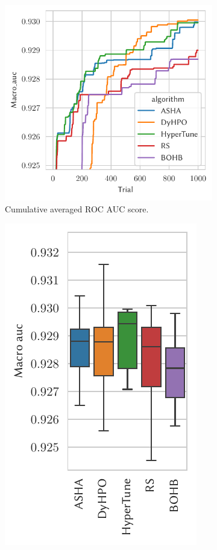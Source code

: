 \begin{figure}[H]
    \begin{subfigure}{.47\textwidth}
        \includegraphics[height=\plotheight]{img/real_exp/ptbxl_rnn_plot.pdf}%
        \caption{Cumulative averaged ROC AUC score.}%
    \end{subfigure}%
    \begin{subfigure}{.26\textwidth}
        \includegraphics[height=\plotheight]{img/real_exp/ptbxl_rnn_boxplot_half.pdf}%

\end{subfigure}
\end{figure}
